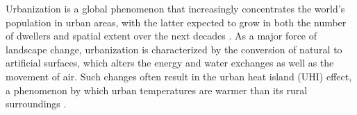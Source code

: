 \documentclass[10pt,letterpaper]{article}
\begin{document}


Urbanization is a global phenomenon that increasingly concentrates the world's population in urban areas, with the latter expected to grow in both the number of dwellers and spatial extent over the next decades \cite{seto2011meta, angel2012atlas, unitednations2018world}.
As a major force of landscape change, urbanization is characterized by the conversion of natural to artificial surfaces, which alters the energy and water exchanges as well as the movement of air. Such changes often result in the urban heat island (UHI) effect, a phenomenon by which urban temperatures are warmer than its rural surroundings \cite{oke1973city,oke1982energetic,arnfield2003two,voogt2003thermal,grimmond2007urbanization,phelan2015urban}. %
\end{document}
